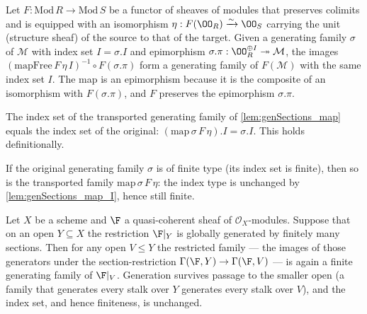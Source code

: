 \begin{lemma}
  \label{lem:genSections_map}
  Let \(F : \mathrm{Mod}\,R \to \mathrm{Mod}\,S\) be a functor of sheaves of modules
  that preserves colimits and is equipped with an isomorphism
  \(\eta : F(\OO_R) \xrightarrow{\sim} \OO_S\) carrying the unit (structure sheaf) of the
  source to that of the target. Given a generating family \(\sigma\) of \(\mathcal{M}\)
  with index set \(I = \sigma.I\) and epimorphism
  \(\sigma.\pi : \OO_R^{\oplus I} \twoheadrightarrow \mathcal{M}\), the images
  \((\mathrm{mapFree}\,F\,\eta\,I)^{-1} \circ F(\sigma.\pi)\) form a generating family of
  \(F(\mathcal{M})\) with the same index set \(I\). The map is an epimorphism because it
  is the composite of an isomorphism with \(F(\sigma.\pi)\), and \(F\) preserves the
  epimorphism \(\sigma.\pi\).
\end{lemma}

\begin{lemma}
  \label{lem:genSections_map_I}
  The index set of the transported generating family of \cref{lem:genSections_map} equals
  the index set of the original: \((\mathrm{map}\,\sigma\,F\,\eta)\!.I = \sigma.I\). This
  holds definitionally.
\end{lemma}

\begin{lemma}
  \label{lem:genSections_map_isFiniteType}
  If the original generating family \(\sigma\) is of finite type (its index set is finite),
  then so is the transported family \(\mathrm{map}\,\sigma\,F\,\eta\): the index type is
  unchanged by \cref{lem:genSections_map_I}, hence still finite.
\end{lemma}

\begin{lemma}
  \label{lem:gf_localGenerators_restrict}
  Let \(X\) be a scheme and \(\F\) a quasi-coherent sheaf of \(\mathcal{O}_X\)-modules.
  Suppose that on an open \(Y \subseteq X\) the restriction \(\F|_Y\) is
  globally generated by finitely many sections. Then for any open \(V \le Y\) the
  restricted family — the images of those generators under the section-restriction
  \(\Gamma(\F, Y) \to \Gamma(\F, V)\) — is again a finite generating family of
  \(\F|_V\). Generation survives passage to the smaller open (a family that generates
  every stalk over \(Y\) generates every stalk over \(V\)), and the index set, and hence
  finiteness, is unchanged.
\end{lemma}

